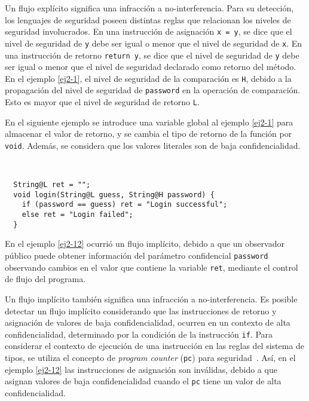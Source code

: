 Un flujo explícito significa una infracción a no-interferencia. Para su detección, los lenguajes de seguridad poseen distintas reglas que relacionan los niveles de seguridad involucrados. En una instrucción de asignación \texttt{x = y}, se dice que el nivel de seguridad de \texttt{y} debe ser igual o menor que el nivel de seguridad de \texttt{x}. En una instrucción de retorno \texttt{return y}, se dice que el nivel de seguridad de \texttt{y} debe ser igual o menor que el nivel de seguridad declarado como retorno del método. En el ejemplo \ref{ej2-1}, el nivel de seguridad de la comparación es \texttt{H}, debido a la propagación del nivel de seguridad de \texttt{password} en la operación de comparación. Esto es mayor que el nivel de seguridad de retorno \texttt{L}.

En el siguiente ejemplo se introduce una variable global al ejemplo \ref{ej2-1} para almacenar el valor de retorno, y se cambia el tipo de retorno de la función por \texttt{void}. Además, se considera que los valores literales son de baja confidencialidad.

\begin{ej} \ \\
  \normalfont
  \label{ej2-12}
\begin{lstlisting}
  String@L ret = "";
  void login(String@L guess, String@H password) {
    if (password == guess) ret = "Login successful";
    else ret = "Login failed";
  }
\end{lstlisting}
\end{ej}

En el ejemplo \ref{ej2-12} ocurrió un flujo implícito, debido a que un observador público puede obtener información del parámetro confidencial \texttt{password} observando cambios en el valor que contiene la variable \texttt{ret}, mediante el control de flujo del programa.

Un flujo implícito también significa una infracción a no-interferencia. Es posible detectar un flujo implícito considerando que las instrucciones de retorno y asignación de valores de baja confidencialidad, ocurren en un contexto de alta confidencialidad, determinado por la condición de la instrucción \texttt{if}. Para considerar el contexto de ejecución de una instrucción en las reglas del sistema de tipos, se utiliza el concepto de \emph{program counter} (\texttt{pc}) para seguridad~\cite{pc}. Así, en el ejemplo \ref{ej2-12} las instrucciones de asignación son inválidas, debido a que asignan valores de baja confidencialidad cuando el \texttt{pc} tiene un valor de alta confidencialidad.


